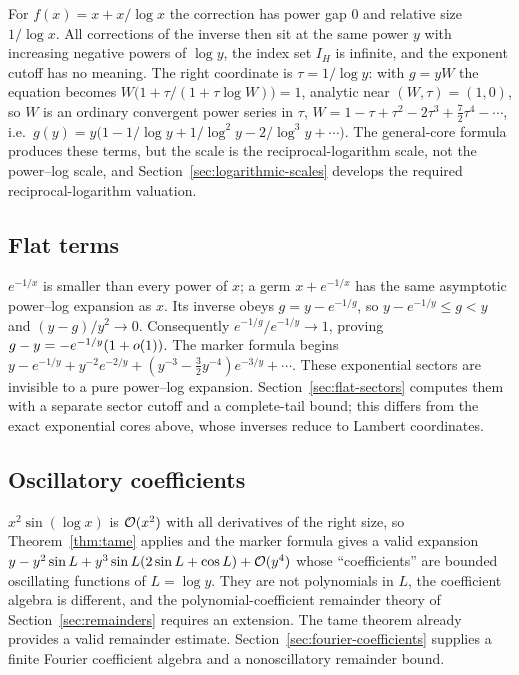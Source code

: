 For $f(x)=x+x/\log x$ the correction has power gap $0$ and relative size $1/\log x$. All corrections of the inverse then sit at the same power $y$ with increasing negative powers of $\log y$, the index set $I_H$ is infinite, and the exponent cutoff has no meaning. The right coordinate is $\tau=1/\log y$: with $g=yW$ the equation becomes $W\bigl(1+\tau/(1+\tau\log W)\bigr)=1$, analytic near $(W,\tau)=(1,0)$, so $W$ is an ordinary convergent power series in $\tau$, $W=1-\tau+\tau^2-2\tau^3+\tfrac72\tau^4-\cdots$, i.e.\ $g(y)=y\bigl(1-1/\log y+1/\log^2y-2/\log^3y+\cdots\bigr)$. The general-core formula produces these terms, but the scale is the reciprocal-logarithm scale, not the power--log scale, and Section~\ref{sec:logarithmic-scales} develops the required reciprocal-logarithm valuation.

\subsection{Flat terms}

$e^{-1/x}$ is smaller than every power of $x$; a germ $x+e^{-1/x}$ has the same asymptotic power--log expansion as $x$. Its inverse obeys $g=y-e^{-1/g}$, so $y-e^{-1/y}\le g<y$ and $(y-g)/y^2\to0$. Consequently $e^{-1/g}/e^{-1/y}\to1$, proving $g-y=-e^{-1/y}(1+o(1))$. The marker formula begins $y-e^{-1/y}+y^{-2}e^{-2/y}+(y^{-3}-\tfrac32y^{-4})e^{-3/y}+\cdots$. These exponential sectors are invisible to a pure power--log expansion. Section~\ref{sec:flat-sectors} computes them with a separate sector cutoff and a complete-tail bound; this differs from the exact exponential cores above, whose inverses reduce to Lambert coordinates.

\subsection{Oscillatory coefficients}

$x^2\sin(\log x)$ is $\mathcal O(x^2)$ with all derivatives of the right size, so Theorem~\ref{thm:tame} applies and the marker formula gives a valid expansion $y-y^2\sin L+y^3\sin L(2\sin L+\cos L)+\mathcal O(y^4)$ whose ``coefficients'' are bounded oscillating functions of $L=\log y$. They are not polynomials in $L$, the coefficient algebra is different, and the polynomial-coefficient remainder theory of Section~\ref{sec:remainders} requires an extension. The tame theorem already provides a valid remainder estimate. Section~\ref{sec:fourier-coefficients} supplies a finite Fourier coefficient algebra and a nonoscillatory remainder bound.

